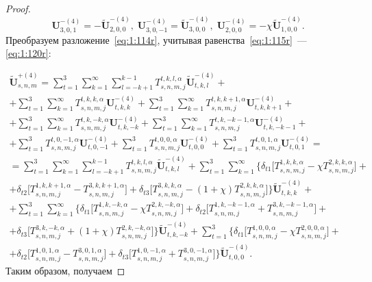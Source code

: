\begin{russian}
\begin{proof}
\begin{equation}
\mathbf{U}_{3,0,1}^{-(4)}=-\mathbf{\tilde U}_{2,0,0}^{-(4)},\;\mathbf{U}_{3,0,-1}^{-(4)}=\mathbf{\tilde U}_{3,0,0}^{-(4)},\;\mathbf{U}_{2,0,0}^{-(4)}=-\chi\mathbf{\tilde U}_{1,0,0}^{-(4)}.
\label{eq:1:120r}
\end{equation}
Преобразуем разложение~\eqref{eq:1:114r}, учитывая равенства~\eqref{eq:1:115r}~--- \eqref{eq:1:120r}:

\begin{multline}
\mathbf{\tilde U}_{s,n,m}^{+(4)}=\sum\limits_{t=1}^3\sum\limits_{k=1}^\infty\sum\limits_{l=-k+1}^{k-1}T_{s,n,m,j}^{t,k,l,\alpha}\mathbf{\tilde U}_{t,k,l}^{-(4)}+ \\
+\sum\limits_{t=1}^3\sum\limits_{k=1}^\infty T_{s,n,m,j}^{t,k,k,\alpha}\mathbf{U}_{t,k,k}^{-(4)}+\sum\limits_{t=1}^3\sum\limits_{k=1}^\infty T_{s,n,m,j}^{t,k,k+1,\alpha}\mathbf{U}_{t,k,k+1}^{-(4)}+ \\
+\sum\limits_{t=1}^3\sum\limits_{k=1}^\infty T_{s,n,m,j}^{t,k,-k,\alpha}\mathbf{U}_{t,k,-k}^{-(4)}+\sum\limits_{t=1}^3\sum\limits_{k=1}^\infty T_{s,n,m,j}^{t,k,-k-1,\alpha}\mathbf{U}_{t,k,-k-1}^{-(4)}+ \\
+\sum\limits_{t=1}^3 T_{s,n,m,j}^{t,0,-1,\alpha}\mathbf{U}_{t,0,-1}^{-(4)}+\sum\limits_{t=1}^3 T_{s,n,m,j}^{t,0,0,\alpha}\mathbf{U}_{t,0,0}^{-(4)}+\sum\limits_{t=1}^3 T_{s,n,m,j}^{t,0,1,\alpha}\mathbf{U}_{t,0,1}^{-(4)}= \\
=\sum\limits_{t=1}^3\sum\limits_{k=1}^\infty\sum\limits_{l=-k+1}^{k-1}T_{s,n,m,j}^{t,k,l,\alpha}\mathbf{\tilde U}_{t,k,l}^{-(4)}+\sum\limits_{t=1}^3\sum\limits_{k=1}^\infty\bigg\{\delta_{t1}\bigg\lbrack T_{s,n,m,j}^{1,k,k,\alpha}-\chi T_{s,n,m,j}^{2,k,k,\alpha}\bigg\rbrack+ \\
+\delta_{t2}\bigg\lbrack T_{s,n,m,j}^{1,k,k+1,\alpha}-T_{s,n,m,j}^{3,k,k+1,\alpha}\bigg\rbrack+\delta_{t3}\bigg\lbrack T_{s,n,m,j}^{3,k,k,\alpha}-(1+\chi)T_{s,n,m,j}^{2,k,k,\alpha}\bigg\rbrack\bigg\}\mathbf{\tilde U}_{t,k,k}^{-(4)}+ \\
+\sum\limits_{t=1}^3\sum\limits_{k=1}^\infty\bigg\{\delta_{t1}\bigg\lbrack T_{s,n,m,j}^{1,k,-k,\alpha}-\chi T_{s,n,m,j}^{2,k,-k,\alpha}\bigg\rbrack+\delta_{t2}\bigg\lbrack T_{s,n,m,j}^{1,k,-k-1,\alpha}+T_{s,n,m,j}^{3,k,-k-1,\alpha}\bigg\rbrack+ \\
+\delta_{t3}\bigg\lbrack T_{s,n,m,j}^{3,k,-k,\alpha}+(1+\chi)T_{s,n,m,j}^{2,k,-k,\alpha}\bigg\rbrack\bigg\}\mathbf{\tilde U}_{t,k,-k}^{-(4)}+
\sum\limits_{t=1}^3\bigg\{\delta_{t1}\bigg\lbrack T_{s,n,m,j}^{1,0,0,\alpha}-\chi T_{s,n,m,j}^{2,0,0,\alpha}\bigg\rbrack+ \\
+\delta_{t2}\bigg\lbrack T_{s,n,m,j}^{1,0,1,\alpha}-T_{s,n,m,j}^{3,0,1,\alpha}\bigg\rbrack+\delta_{t3}\bigg\lbrack T_{s,n,m,j}^{1,0,-1,\alpha}+T_{s,n,m,j}^{3,0,-1,\alpha}\bigg\rbrack\bigg\}\mathbf{\tilde U}_{t,0,0}^{-(4)}.
\label{eq:1:121r}
\end{multline}
Таким образом, получаем


\end{proof}
\end{russian}
